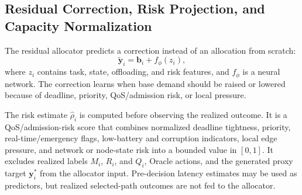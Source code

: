 \subsection{Residual Correction, Risk Projection, and Capacity Normalization}

The residual allocator predicts a correction instead of an allocation from scratch:
\begin{equation}
\tilde{\mathbf{y}}_i = \mathbf{b}_i + f_{\phi}(z_i),
\label{eq:residual_alloc_main}
\end{equation}
where $z_i$ contains task, state, offloading, and risk features, and $f_{\phi}$ is a neural network. The correction learns when base demand should be raised or lowered because of deadline, priority, QoS/admission risk, or local pressure.

The risk estimate $\hat{\rho}_i$ is computed before observing the realized outcome. It is a QoS/admission-risk score that combines normalized deadline tightness, priority, real-time/emergency flags, low-battery and corruption indicators, local edge pressure, and network or node-state risk into a bounded value in $[0,1]$. It excludes realized labels $M_i$, $R_i$, and $Q_i$, Oracle actions, and the generated proxy target $\mathbf{y}_i^{*}$ from the allocator input. Pre-decision latency estimates may be used as predictors, but realized selected-path outcomes are not fed to the allocator.

